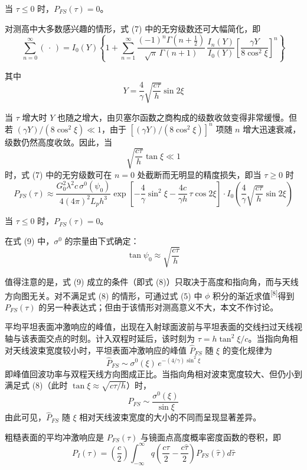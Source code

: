 当 $\tau \leq 0$ 时，$P_{FS}(\tau) = 0$。

对测高中大多数感兴趣的情形，式 (7) 中的无穷级数还可大幅简化，即
\[
\sum_{n=0}^{\infty}(\,\cdot\,) = I_{0}(Y)\left\{1 + \sum_{n=1}^{\infty}\frac{(-1)^{n}\Gamma\!\left(n + \tfrac{1}{2}\right)}{\sqrt{\pi}\,\Gamma(n+1)}\,\frac{I_{n}(Y)}{I_{0}(Y)}\left[\frac{\gamma Y}{8\cos^{2}\xi}\right]^{n}\right\}
\]

其中
\[
Y = \frac{4}{\gamma}\sqrt{\frac{c\tau}{h}}\sin 2\xi
\]

当 $\tau$ 增大时 $Y$ 也随之增大，由贝塞尔函数之商构成的级数收敛变得非常缓慢。但若 $(\gamma Y)/(8\cos^{2}\xi) \ll 1$，由于 $[(\gamma Y)/(8\cos^{2}\xi)]^{n}$ 项随 $n$ 增大迅速衰减，级数仍然高度收敛。因此，当
\[
\sqrt{\frac{c\tau}{h}}\tan\xi \ll 1
\tag{8}
\]
时，式 (7) 中的无穷级数可在 $n = 0$ 处截断而无明显的精度损失，即当 $\tau \geq 0$ 时
\[
P_{FS}(\tau) \approx \frac{G_{0}^{2}\lambda^{2}c\,\sigma^{0}(\psi_{0})}{4(4\pi)^{2}L_{p}h^{3}}\exp\left[-\frac{4}{\gamma}\sin^{2}\xi - \frac{4c}{\gamma h}\,\tau\cos 2\xi\right] \cdot I_{0}\!\left(\frac{4}{\gamma}\sqrt{\frac{c\tau}{h}}\sin 2\xi\right)
\tag{9}
\]

当 $\tau \leq 0$ 时，$P_{FS}(\tau) = 0$。

在式 (9) 中，$\sigma^{0}$ 的宗量由下式确定：
\[
\tan\psi_{0} \approx \sqrt{\frac{c\tau}{h}}
\tag{10}
\]

值得注意的是，式 (9) 成立的条件（即式 (8)）只取决于高度和指向角，而与天线方向图无关。对不满足式 (8) 的情形，可通过式 (5) 中 $\phi$ 积分的渐近求值\textsuperscript{[8]}得到 $P_{FS}(\tau)$ 的另一种表达式；但由于该情形对测高意义不大，本文不作讨论。

平均平坦表面冲激响应的峰值，出现在入射球面波前与平坦表面的交线扫过天线视轴与该表面交点的时刻。计入双程时延后，该时刻为 $\tau = h\tan^{2}\xi/c$。当指向角相对天线波束宽度较小时，平坦表面冲激响应的峰值 $\widehat{P}_{FS}$ 随 $\xi$ 的变化规律为
\[
\widehat{P}_{FS} \sim \sigma^{0}(\xi)\,e^{-(4/\gamma)\sin^{2}\xi}
\]
即峰值回波功率与双程天线方向图成正比。当指向角相对波束宽度较大、但仍小到满足式 (8)（此时 $\tan\xi \approx \sqrt{c\tau/h}$）时，
\[
\widehat{P}_{FS} \sim \frac{\sigma^{0}(\xi)}{\sin\xi}
\]
由此可见，$\widehat{P}_{FS}$ 随 $\xi$ 相对天线波束宽度的大小的不同而呈现显著差异。

粗糙表面的平均冲激响应是 $P_{FS}(\tau)$ 与镜面点高度概率密度函数的卷积，即
\[
P_{I}(\tau) = \left(\frac{c}{2}\right)\int_{-\infty}^{\infty} q\!\left(\frac{c\tau}{2} - \frac{c\widehat{\tau}}{2}\right)P_{FS}\!\left(\widehat{\tau}\right)d\widehat{\tau}
\tag{11}
\]

